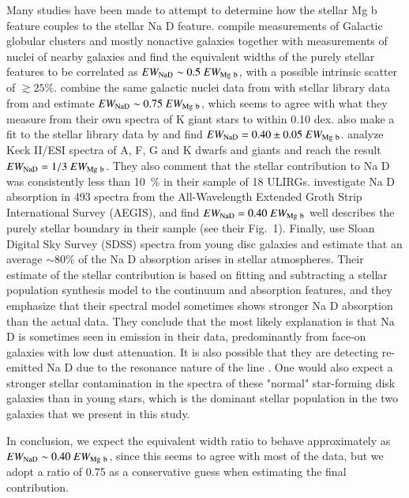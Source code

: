 \documentclass[a4wide,12pt]{book}
\begin{document}
{Many studies have been made to attempt to determine how the stellar Mg b feature couples to the stellar Na D feature. 
\citet{rupke-2002} compile measurements of Galactic globular clusters and mostly nonactive galaxies \citep{bica-alloin1986} together with measurements of nuclei of nearby galaxies \citep{heckman-1980} and find the equivalent widths of the purely stellar features to be correlated as $EW_{\rm Na D} \sim 0.5~EW_{\rm Mg~b}$, with a possible intrinsic scatter of $\gtrsim 25 \%$.
\citet{heckman-2000} combine the same galactic nuclei data from \citet{heckman-1980} with stellar library data from \citet{jacoby-1984} and estimate $EW_{\rm Na D} \sim 0.75~EW_{\rm Mg~b}$, which seems to agree with what they measure from their own spectra of K giant stars to within 0.10 dex. 
\citet{schwartz-martin2004} also make a fit to the stellar library data by \citet{jacoby-1984} and find $EW_{\rm Na D} = 0.40 \pm 0.05~EW_{\rm Mg~b}$. \citet{martin2005} analyze Keck II/ESI spectra of A, F, G and K dwarfs and giants and reach the result $EW_{\rm Na D} = 1/3~EW_{\rm Mg~b}$. They also comment that the stellar contribution to Na D was consistently less than 10~\% in their sample of 18 ULIRGs.  
\citet{sato-2009} investigate Na D absorption in 493 spectra from the All-Wavelength Extended Groth Strip International Survey (AEGIS), and find $EW_{\rm Na D} = 0.40~EW_{\rm Mg~b}$ well describes the purely stellar boundary in their sample (see their Fig.~1).
Finally, \citet{chen-2010} use Sloan Digital Sky Survey (SDSS) spectra from young disc galaxies and estimate that an average $\sim 80\%$ of the Na D absorption arises in stellar atmospheres. Their estimate of the stellar contribution is based on fitting and subtracting a stellar population synthesis model to the continuum and absorption features, and they emphasize that their spectral model sometimes shows stronger Na D absorption than the actual data. They conclude that the most likely explanation is that Na D is sometimes seen in emission in their data, predominantly from face-on galaxies with low dust attenuation. It is also possible that they are detecting re-emitted Na D due to the resonance nature of the line \citep[see][and Section~\ref{Sec:NaDresonance} below]{prochaska-2011}. 
One would also expect a stronger stellar contamination in the spectra of these "normal" star-forming disk galaxies than in young stars, which is the dominant stellar population in the two galaxies that we present in this study.

In conclusion, we expect the equivalent width ratio to behave approximately as $EW_{\rm Na D} \sim 0.40~EW_{\rm Mg~b}$, since this seems to agree with most of the data, but we adopt a ratio of 0.75 as a conservative guess when estimating the final contribution. 

}
\end{document}
